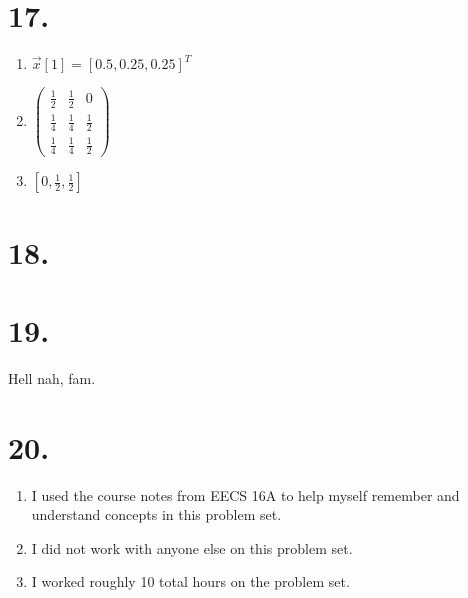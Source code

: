 \documentclass[11pt]{article}
\newenvironment{qparts}{\begin{enumerate}[{(}a{)}]}{\end{enumerate}}
\begin{document}
\section*{17.}
\begin{qparts}
\item
$\vec{x}[1] = [0.5, 0.25, 0.25]^T$
\item
$
    \begin{pmatrix}
        \frac{1}{2} & \frac{1}{2} & 0 \\
        \frac{1}{4} & \frac{1}{4} & \frac{1}{2} \\
        \frac{1}{4} & \frac{1}{4} & \frac{1}{2}
    \end{pmatrix} 
$
\item
$[0, \frac{1}{2}, \frac{1}{2}]$
\end{qparts}
\newpage
\section*{18.}
\newpage
\section*{19.}
Hell nah, fam.
\newpage
\section*{20.}
\begin{qparts}
\item
I used the course notes from EECS 16A to help myself remember and understand concepts in this problem set.
\item
I did not work with anyone else on this problem set.
\item
I worked roughly 10 total hours on the problem set.
\end{qparts}
\end{document}
